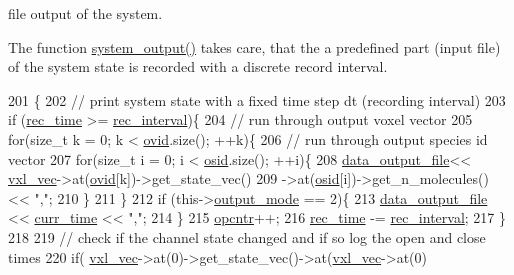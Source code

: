 file output of the system. 

The function \hyperlink{classnw_1_1_gillespie___sys_a48bc0eec3fc239802276ea1499326352}{system\+\_\+output()} takes care, that the a predefined part (input file) of the system state is recorded with a discrete record interval. 
\begin{DoxyCode}
201                                         \{
202 \textcolor{comment}{//  print system state with a fixed time step dt (recording interval)}
203     \textcolor{keywordflow}{if} (\hyperlink{classnw_1_1_gillespie___sys_a2209a66c1cd88b06fb8a0e8b41d72b29}{rec\_time} >= \hyperlink{classnw_1_1_gillespie___sys_a0de156c39c87a334da7477cb2a9c02cf}{rec\_interval})\{
204 \textcolor{comment}{//          run through output voxel vector}
205             \textcolor{keywordflow}{for}(\textcolor{keywordtype}{size\_t} k = 0; k < \hyperlink{classnw_1_1_gillespie___sys_a136eaaf0a00fc739e797f3b2bea22386}{ovid}.size(); ++k)\{
206 \textcolor{comment}{//              run through output species id vector}
207                 \textcolor{keywordflow}{for}(\textcolor{keywordtype}{size\_t} i = 0; i < \hyperlink{classnw_1_1_gillespie___sys_a138ba3dc15d538a31dbc7c1200bc5637}{osid}.size(); ++i)\{
208                     \hyperlink{classnw_1_1_gillespie___sys_aec438472b938a410f0d31af0ae73a164}{data\_output\_file}<<  \hyperlink{classnw_1_1_gillespie___sys_acf4d19490ed7a8447296d7c206ef0590}{vxl\_vec}->at(\hyperlink{classnw_1_1_gillespie___sys_a136eaaf0a00fc739e797f3b2bea22386}{ovid}[k])->get\_state\_vec()
209                                         ->at(\hyperlink{classnw_1_1_gillespie___sys_a138ba3dc15d538a31dbc7c1200bc5637}{osid}[i])->get\_n\_molecules() << \textcolor{stringliteral}{","};
210                 \}
211             \}
212         \textcolor{keywordflow}{if} (this->\hyperlink{classnw_1_1_gillespie___sys_aa5b4943f29fb0276596ace75e384565e}{output\_mode} == 2)\{
213             \hyperlink{classnw_1_1_gillespie___sys_aec438472b938a410f0d31af0ae73a164}{data\_output\_file} << \hyperlink{classnw_1_1_gillespie___sys_ac83bb4eaee1f8b46610a8243a83fb3ad}{curr\_time} << \textcolor{stringliteral}{","};
214         \}
215         \hyperlink{classnw_1_1_gillespie___sys_a31f847a062a1cdc9b4a7eed103447da7}{opcntr}++;
216         \hyperlink{classnw_1_1_gillespie___sys_a2209a66c1cd88b06fb8a0e8b41d72b29}{rec\_time} -= \hyperlink{classnw_1_1_gillespie___sys_a0de156c39c87a334da7477cb2a9c02cf}{rec\_interval};
217     \}
218 
219 \textcolor{comment}{//  check if the channel state changed and if so log the open and close times}
220     \textcolor{keywordflow}{if}( \hyperlink{classnw_1_1_gillespie___sys_acf4d19490ed7a8447296d7c206ef0590}{vxl\_vec}->at(0)->get\_state\_vec()->at(\hyperlink{classnw_1_1_gillespie___sys_acf4d19490ed7a8447296d7c206ef0590}{vxl\_vec}->at(0)

\end{DoxyCode}
